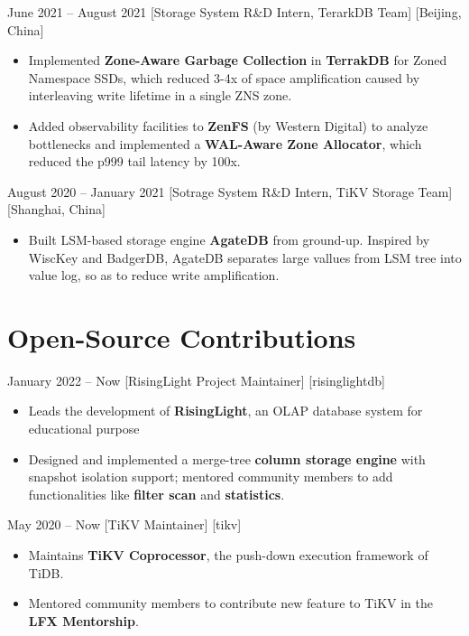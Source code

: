\documentclass{chicv}
\begin{document}
  {June 2021 – August 2021}
  [Storage System R\&D Intern, TerarkDB Team]
  [Beijing, China]

\begin{itemize}
  \item Implemented \textbf{Zone-Aware Garbage Collection} in \textbf{TerrakDB} for Zoned Namespace SSDs, which reduced 3-4x of space amplification caused by interleaving write lifetime in a single ZNS zone. %
  \item Added observability facilities to \textbf{ZenFS} (by Western Digital) to analyze bottlenecks and implemented a \textbf{WAL-Aware Zone Allocator}, which reduced the p999 tail latency by 100x. %
\end{itemize}

  {August 2020 -- January 2021}
  [Sotrage System R\&D Intern, TiKV Storage Team][Shanghai, China]
  \begin{itemize}
    \item Built LSM-based storage engine \textbf{AgateDB} from ground-up. Inspired by WiscKey and BadgerDB, AgateDB separates large vallues from LSM tree into value log, so as to reduce write amplification.
  \end{itemize}

\section{Open-Source Contributions}

  {January 2022 -- Now}
  [RisingLight Project Maintainer]
  [risinglightdb] %
  \begin{itemize}
    \item Leads the development of \textbf{RisingLight}, an OLAP database system for educational purpose
    \item Designed and implemented a merge-tree \textbf{column storage engine} with snapshot isolation support; mentored community members to add functionalities like \textbf{filter scan} and \textbf{statistics}.
  \end{itemize}

    {May 2020 -- Now}
    [TiKV Maintainer]
    [tikv] %
    \begin{itemize}
      \item Maintains \textbf{TiKV Coprocessor}, the push-down execution framework of TiDB.
      \item Mentored community members to contribute new feature to TiKV in the \textbf{LFX Mentorship}. %
    \end{itemize}
\end{document}
